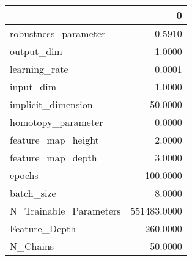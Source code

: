 \begin{tabular}{lr}
\toprule
{} &            0 \\
\midrule
robustness\_parameter   &       0.5910 \\
output\_dim             &       1.0000 \\
learning\_rate          &       0.0001 \\
input\_dim              &       1.0000 \\
implicit\_dimension     &      50.0000 \\
homotopy\_parameter     &       0.0000 \\
feature\_map\_height     &       2.0000 \\
feature\_map\_depth      &       3.0000 \\
epochs                 &     100.0000 \\
batch\_size             &       8.0000 \\
N\_Trainable\_Parameters &  551483.0000 \\
Feature\_Depth          &     260.0000 \\
N\_Chains               &      50.0000 \\
\bottomrule
\end{tabular}
